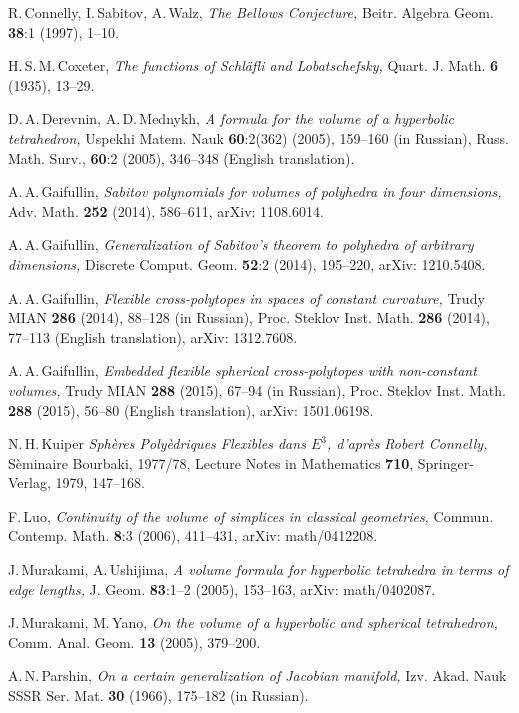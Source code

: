 \documentclass[reqno,tbtags,12pt]{amsart}
\numberwithin{equation}{section}
\theoremstyle{definition}
\begin{document}
\begin{thebibliography}{99}
 R.\,Connelly, I.\,Sabitov, A.\,Walz, \textit{The Bellows Conjecture,} Beitr. Algebra Geom. \textbf{38}:1 (1997), 1--10.

 H.\,S.\,M.\,Coxeter, \textit{The functions of Schl\"afli and Lobatschefsky,} Quart. J. Math. \textbf{6} (1935), 13--29.

 D.\,A.\,Derevnin, A.\,D.\,Mednykh, \textit{A formula for the volume of a hyperbolic tetrahedron,} Uspekhi Matem. Nauk \textbf{60}:2(362) (2005),  159--160 (in Russian), Russ. Math. Surv., \textbf{60}:2 (2005), 346--348 (English translation).

 A.\,A.\,Gaifullin, \textit{Sabitov polynomials for volumes of polyhedra in four dimensions,} Adv. Math. \textbf{252} (2014), 586--611, arXiv: 1108.6014.

 A.\,A.\,Gaifullin, \textit{Generalization of Sabitov's theorem to polyhedra of arbitrary dimensions,} Discrete Comput. Geom. \textbf{52}:2 (2014), 195--220, arXiv: 1210.5408.

 A.\,A.\,Gaifullin, \textit{Flexible cross-polytopes in spaces of constant curvature,} Trudy MIAN \textbf{286} (2014), 88--128 (in Russian), Proc. Steklov Inst. Math. \textbf{286} (2014), 77--113 (English translation), arXiv: 1312.7608.

 A.\,A.\,Gaifullin, \textit{Embedded flexible spherical cross-polytopes with non-constant volumes,} Trudy MIAN \textbf{288} (2015), 67--94 (in Russian), Proc. Steklov Inst. Math. \textbf{288} (2015), 56--80 (English translation), arXiv: 1501.06198.


 N.\,H.\,Kuiper
\textit{Sph\`eres Poly\`edriques Flexibles dans $E^3$, d'apr\`es Robert Connelly,}
 S\`eminaire Bourbaki, 1977/78, Lecture Notes in Mathematics
\textbf{710}, Springer-Verlag, 1979, 147--168.

 F.\,Luo, \textit{Continuity of the volume of simplices in classical geometries,} Commun. Contemp. Math. \textbf{8}:3 (2006), 411--431, arXiv: math/0412208.

 J.\,Murakami, A.\,Ushijima, \textit{A volume formula for hyperbolic tetrahedra in terms of edge lengths,} J. Geom. \textbf{83}:1--2 (2005), 153--163, arXiv: math/0402087.

 J.\,Murakami, M.\,Yano, \textit{On the volume of a hyperbolic and spherical tetrahedron,} Comm. Anal. Geom. \textbf{13} (2005), 379--200.

 A.\,N.\,Parshin, \textit{On a certain generalization of Jacobian manifold,} Izv. Akad. Nauk SSSR Ser. Mat. \textbf{30} (1966), 175--182 (in Russian).


\end{thebibliography}
\end{document}
